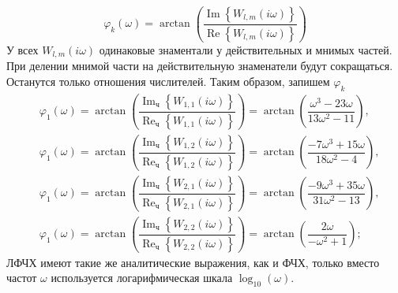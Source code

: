 \documentclass[a4paper, 12pt]{article}
\begin{document}
    $$
    \varphi_k(\omega)=\arctan\left(\dfrac{\operatorname{Im}\left\{ W_{l,m}(i\omega) \right\}}{\operatorname{Re}\left\{ W_{l,m}(i\omega)\right\}}\right)
    $$
    У всех $W_{l,m}(i\omega)$ одинаковые знаментали у действительных и мнимых частей. При делении
    мнимой части на действительную знаменатели будут сокращаться. Останутся только отношения числителей.
    Таким образом, запишем $\varphi_k$
    \begin{align*}
        &\varphi_1(\omega)=\arctan\left(\dfrac{\operatorname{Im}_\text{ч}\left\{ W_{1,1}(i\omega) \right\}}{\operatorname{Re}_\text{ч}\left\{ W_{1,1}(i\omega)\right\}}\right)=
        \arctan\left( \dfrac{\omega^3-23\omega}{13\omega^2-11} \right),\\
        &\varphi_1(\omega)=\arctan\left(\dfrac{\operatorname{Im}_\text{ч}\left\{ W_{1,2}(i\omega) \right\}}{\operatorname{Re}_\text{ч}\left\{ W_{1,2}(i\omega)\right\}}\right)=
        \arctan\left( \dfrac{-7\omega^3+15\omega}{18\omega^2-4} \right),\\
        &\varphi_1(\omega)=\arctan\left(\dfrac{\operatorname{Im}_\text{ч}\left\{ W_{2,1}(i\omega) \right\}}{\operatorname{Re}_\text{ч}\left\{ W_{2,1}(i\omega)\right\}}\right)=
        \arctan\left( \dfrac{-9\omega^3+35\omega}{31\omega^2-13} \right),\\
        &\varphi_1(\omega)=\arctan\left(\dfrac{\operatorname{Im}_\text{ч}\left\{ W_{2,2}(i\omega) \right\}}{\operatorname{Re}_\text{ч}\left\{ W_{2,2}(i\omega)\right\}}\right)=
        \arctan\left( \dfrac{2\omega}{-\omega^2+1} \right);
    \end{align*}
    ЛФЧХ имеют такие же аналитические выражения, как и ФЧХ, только вместо частот $\omega$ используется логарифмическая шкала $\log_{10}\left( \omega \right)$.
\end{document}

